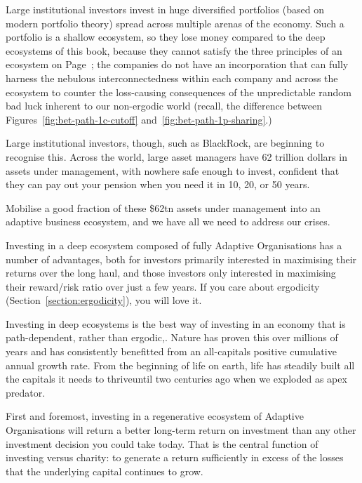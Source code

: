 Large institutional investors invest in huge diversified portfolios (based on modern portfolio theory) spread across multiple arenas of the economy. Such a portfolio is a shallow ecosystem, so they lose money compared to the deep ecosystems of this book, because they cannot satisfy the three principles of an ecosystem on Page~\pageref{list:ecosystem-principles}; the companies do not have an incorporation that can fully harness the nebulous interconnectedness within each company and across the ecosystem to counter the loss\hyp{}causing consequences of the unpredictable random bad luck inherent to our non-ergodic world (recall, the difference between Figures~\ref{fig:bet-path-1c-cutoff} and~\ref{fig:bet-path-1p-sharing}.) 


Large institutional investors, though, such as BlackRock, are beginning to recognise this. Across the world, large asset managers have 62 trillion dollars in assets under management, with nowhere safe enough to invest, confident that they can pay out your pension when you need it in 10, 20, or 50 years. 


Mobilise a good fraction of these \$62tn assets under management into an adaptive business ecosystem, and we have all we need to address our crises.


Investing in a deep ecosystem composed of fully Adaptive Organisations has a number of advantages, both for investors primarily interested in maximising their returns over the long haul, and those investors only interested in maximising their reward/risk ratio over just a few years.  If you care about ergodicity  (Section~\ref{section:ergodicity}), you will love it.


Investing in deep ecosystems is the best way of investing in an economy that is  path-dependent, rather than ergodic,. Nature has proven this over millions of years and has consistently benefitted from an all-capitals positive cumulative annual growth rate. From the beginning of life on earth, life has steadily built all the capitals  it needs to thrive\textemdash until two centuries ago when we exploded as apex predator. 


First and foremost, investing in a regenerative ecosystem of Adaptive Organisations will return a better long-term return on investment than any other investment decision you could take today. That is the central function of investing versus charity: to generate a return sufficiently in excess of the losses that the underlying capital continues to grow.


